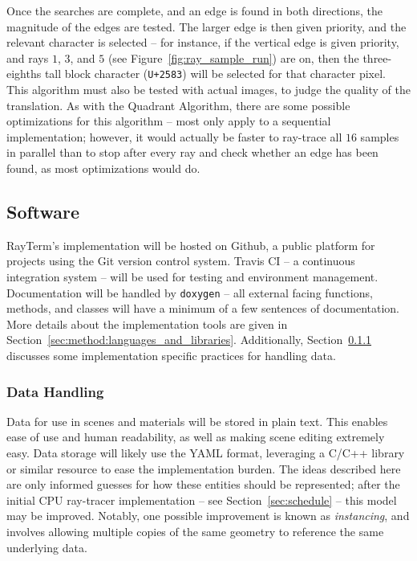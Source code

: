 \documentclass[11pt]{article}
\newcommand{\name}{{\sc RayTerm}}
\begin{document}
Once the searches are complete, and an edge is found in both directions, the magnitude of the edges are tested.
The larger edge is then given priority, and the relevant character is selected -- for instance, if the vertical edge is given priority, and rays $1$, $3$, and $5$ (see Figure~\ref{fig:ray_sample_run}) are on, then the three-eighths tall block character (\texttt{U+2583}) will be selected for that character pixel.
This algorithm must also be tested with actual images, to judge the quality of the translation.
As with the Quadrant Algorithm, there are some possible optimizations for this algorithm -- most only apply to a sequential implementation; however, it would actually be faster to ray-trace all $16$ samples in parallel than to stop after every ray and check whether an edge has been found, as most optimizations would do.

\subsection{Software}
\label{sec:method:software}

\name's implementation will be hosted on Github, a public platform for projects using the Git version control system.
Travis CI \cite{travisci} -- a continuous integration system -- will be used for testing and environment management.
Documentation will be handled by \texttt{doxygen} \cite{van2008doxygen} -- all external facing functions, methods, and classes will have a minimum of a few sentences of documentation.
More details about the implementation tools are given in Section~\ref{sec:method:languages_and_libraries}.
Additionally, Section~\ref{sec:method:data_handling} discusses some implementation specific practices for handling data.

\subsubsection{Data Handling}
\label{sec:method:data_handling}

Data for use in scenes and materials will be stored in plain text.
This enables ease of use and human readability, as well as making scene editing extremely easy.
Data storage will likely use the YAML format, leveraging a C/C++ library or similar resource to ease the implementation burden.
The ideas described here are only informed guesses for how these entities should be represented; after the initial CPU ray-tracer implementation -- see Section~\ref{sec:schedule} -- this model may be improved.
Notably, one possible improvement is known as {\it instancing}, and involves allowing multiple copies of the same geometry to reference the same underlying data.
\end{document}
